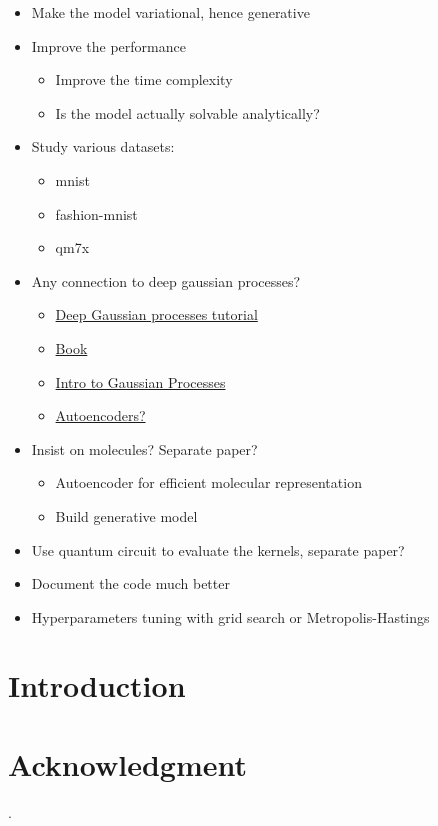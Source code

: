 \documentclass[conference]{IEEEtran}
\begin{document}
    \begin{itemize}

        \item Make the model variational, hence generative
        \item Improve the performance
        \begin{itemize}
            \item Improve the time complexity
            \item Is the model actually solvable analytically?
        \end{itemize}
        \item Study various datasets: 
        \begin{itemize}
            \item mnist
            \item fashion-mnist 
            \item qm7x
        \end{itemize}
        \item Any connection to deep gaussian processes?
        \begin{itemize}
            \item \href{http://inverseprobability.com/talks/notes/deep-gaussian-processes-a-motivation-and-introduction.html}{Deep Gaussian processes tutorial}
            \item \href{http://gaussianprocess.org/gpml/chapters/RW.pdf}{Book}
            \item \href{http://inverseprobability.com/talks/notes/gpss-session-1.html}{Intro to Gaussian Processes}
            \item \href{https://link.springer.com/content/pdf/10.1007/s10994-018-5723-3.pdf}{Autoencoders?}
        \end{itemize}
        \item Insist on molecules? Separate paper?
        \begin{itemize}
            \item Autoencoder for efficient molecular representation
            \item Build generative model
        \end{itemize}
        \item Use quantum circuit to evaluate the kernels, separate paper?
        \item Document the code much better
        \item Hyperparameters tuning with grid search or Metropolis-Hastings

    \end{itemize}

\section{Introduction}

\section*{Acknowledgment}

\cite{IEEEhowto:IEEEtranpage}.

  


\vspace{12pt}
\end{document}
